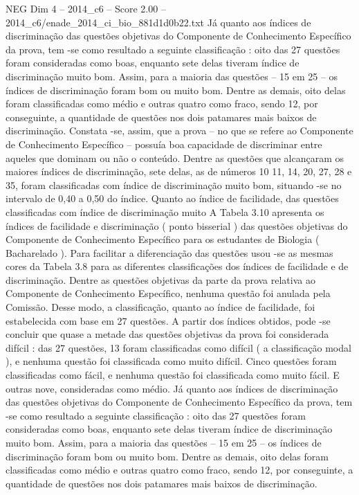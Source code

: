 \begin{textsample}{NEG Dim 4 – 2014\_c6 – Score 2.00 – 2014\_c6/enade\_2014\_ci\_bio\_881d1d0b22.txt}
Já quanto aos índices de discriminação das questões objetivas do Componente de Conhecimento Específico da prova, tem -se como resultado a seguinte classificação : oito das 27 questões foram consideradas como boas, enquanto sete delas tiveram índice de discriminação muito bom.
Assim, para a maioria das questões – 15 em 25 – os índices de discriminação foram bom ou muito bom.
Dentre as demais, oito delas foram classificadas como médio e outras quatro como fraco, sendo 12, por conseguinte, a quantidade de questões nos dois patamares mais baixos de discriminação.
Constata -se, assim, que a prova – no que se refere ao Componente de Conhecimento Específico – possuía boa capacidade de discriminar entre aqueles que dominam ou não o conteúdo.
Dentre as questões que alcançaram os maiores índices de discriminação, sete delas, as de números 10 11, 14, 20, 27, 28 e 35, foram classificadas com índice de discriminação muito bom, situando -se no intervalo de 0,40 a 0,50 do índice.
Quanto ao índice de facilidade, das questões classificadas com índice de discriminação muito A Tabela 3.10 apresenta os índices de facilidade e discriminação ( ponto bisserial ) das questões objetivas do Componente de Conhecimento Específico para os estudantes de Biologia ( Bacharelado ).
Para facilitar a diferenciação das questões usou -se as mesmas cores da Tabela 3.8 para as diferentes classificações dos índices de facilidade e de discriminação.
Dentre as questões objetivas da parte da prova relativa ao Componente de Conhecimento Específico, nenhuma questão foi anulada pela Comissão.
Desse modo, a classificação, quanto ao índice de facilidade, foi estabelecida com base em 27 questões.
A partir dos índices obtidos, pode -se concluir que quase a metade das questões objetivas da prova foi considerada difícil : das 27 questões, 13 foram classificadas como difícil ( a classificação modal ), e nenhuma questão foi classificada como muito difícil.
Cinco questões foram classificadas como fácil, e nenhuma questão foi classificada como muito fácil.
E outras nove, consideradas como médio.
Já quanto aos índices de discriminação das questões objetivas do Componente de Conhecimento Específico da prova, tem -se como resultado a seguinte classificação : oito das 27 questões foram consideradas como boas, enquanto sete delas tiveram índice de discriminação muito bom.
Assim, para a maioria das questões – 15 em 25 – os índices de discriminação foram bom ou muito bom.
Dentre as demais, oito delas foram classificadas como médio e outras quatro como fraco, sendo 12, por conseguinte, a quantidade de questões nos dois patamares mais baixos de discriminação.

\end{textsample}
